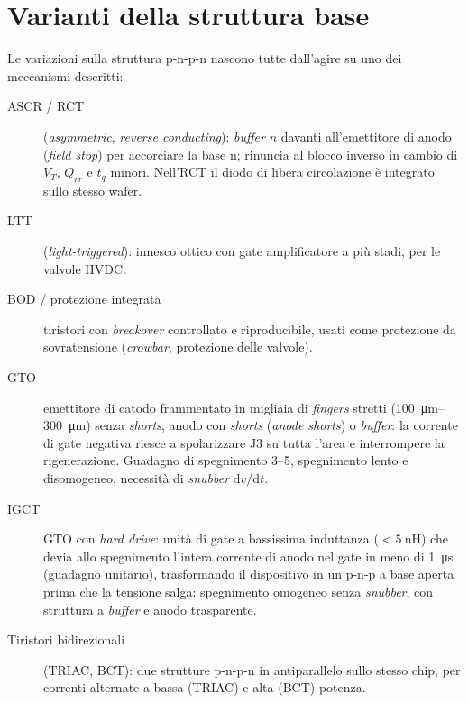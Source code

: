 \documentclass[11pt,a4paper]{article}
\newcommand{\tq}{\ensuremath{t_q}}
\newcommand{\dvdt}{\ensuremath{\mathrm{d}v/\mathrm{d}t}}
\newcommand{\en}[1]{\emph{#1}}   %
\begin{document}
\section{Varianti della struttura base}
Le variazioni sulla struttura p-n-p-n nascono tutte dall'agire su uno dei meccanismi descritti:
\begin{description}
  \item[ASCR / RCT] (\en{asymmetric}, \en{reverse conducting}): \en{buffer} $n$ davanti all'emettitore di anodo (\en{field stop}) per accorciare la base n; rinuncia al blocco inverso in cambio di $V_T$, $Q_{rr}$ e $\tq$ minori. Nell'RCT il diodo di libera circolazione è integrato sullo stesso wafer.
  \item[LTT] (\en{light-triggered}): innesco ottico con gate amplificatore a più stadi, per le valvole HVDC.
  \item[BOD / protezione integrata] tiristori con \en{breakover} controllato e riproducibile, usati come protezione da sovratensione (\en{crowbar}, protezione delle valvole).
  \item[GTO] emettitore di catodo frammentato in migliaia di \en{fingers} stretti (\qtyrange{100}{300}{\um}) senza \en{shorts}, anodo con \en{shorts} (\en{anode shorts}) o \en{buffer}: la corrente di gate negativa riesce a spolarizzare J3 su tutta l'area e interrompere la rigenerazione. Guadagno di spegnimento \numrange{3}{5}, spegnimento lento e disomogeneo, necessità di \en{snubber} $\dvdt$.
  \item[IGCT] GTO con \en{hard drive}: unità di gate a bassissima induttanza ($<\qty{5}{\nano\henry}$) che devia allo spegnimento l'intera corrente di anodo nel gate in meno di \qty{1}{\us} (guadagno unitario), trasformando il dispositivo in un p-n-p a base aperta prima che la tensione salga: spegnimento omogeneo senza \en{snubber}, con struttura a \en{buffer} e anodo trasparente.
  \item[Tiristori bidirezionali] (TRIAC, BCT): due strutture p-n-p-n in antiparallelo sullo stesso chip, per correnti alternate a bassa (TRIAC) e alta (BCT) potenza.
\end{description}

\end{document}
